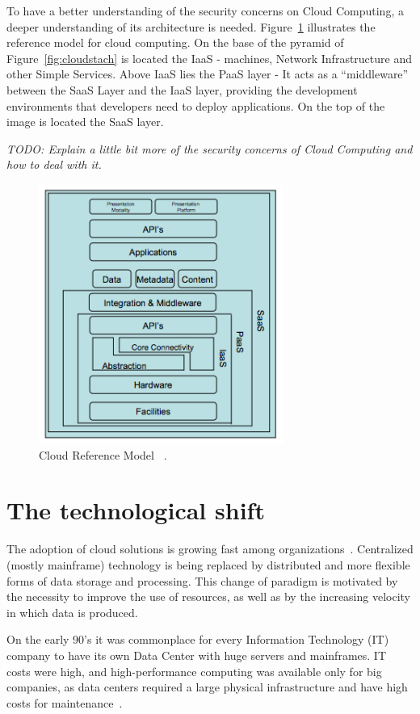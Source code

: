 To have a better understanding of the security concerns on Cloud Computing, a deeper understanding of its architecture is needed. 
Figure~\ref{fig:cloudmodel} illustrates the reference model for cloud computing. On the base of the pyramid of Figure~\ref{fig:cloudstach} is located the IaaS - machines, Network Infrastructure and other Simple Services. Above IaaS lies the PaaS layer - It acts as a ``middleware'' between the SaaS Layer and the IaaS layer, providing the development environments that developers need to deploy applications. On the top of the image is located the SaaS layer. 

\textit{TODO: Explain a little bit more of the security concerns of Cloud Computing and how to deal with it.}

\begin{figure}[ht!]
\centering
\includegraphics[width=80mm]{Imagens/cloudreferencemodel.png}
\caption{Cloud Reference Model ~\cite{alliance2009}.\label{fig:cloudmodel}}
\end{figure}


\section{The technological shift}
The adoption of cloud solutions is growing fast among organizations~\cite{Armbrust09m.:above}.
Centralized (mostly mainframe) technology is being replaced by distributed and more flexible forms of data storage and processing.
This change of paradigm is motivated by the necessity to improve the use of resources, as well as by the increasing velocity in which data is produced.

On the early 90's it was commonplace for every Information Technology (IT) company to have its own Data Center with huge servers and mainframes. 
IT costs were high, and high-performance computing was available only for big companies, as data centers required a large physical infrastructure and have high costs for maintenance~\cite{Armbrust09m.:above}.

